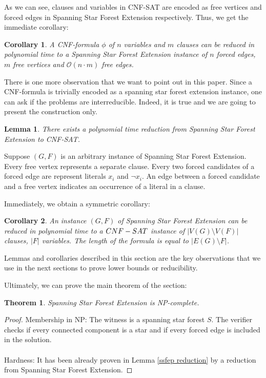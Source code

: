\documentclass[en]{pracamgr}
\newtheorem{theorem}{Theorem}
\newtheorem{lemma}{Lemma}
\newtheorem{corollary}{Corollary}
\newenvironment{sproof}{%
	\renewcommand{\proofname}{Proof (sketch).}\proof}{\endproof}
\newcommand{\ssfep}{{\sc Spanning Star Forest Extension}}
\newcommand{\cnfsat}{{\sc CNF-SAT}}
\begin{document}
As we can see, clauses and variables in \cnfsat{} are encoded as free vertices and forced edges in \ssfep{} respectively. Thus, we get the immediate corollary:

\begin{corollary}\label{ssfep size}
	A CNF-formula $\phi$ of $n$ variables and $m$ clauses can be reduced in polynomial time to a \ssfep{} instance of $n$ forced edges, $m$ free vertices and $\mathcal{O}(n\cdot m)$ free edges.
\end{corollary}

There is one more observation that we want to point out in this paper. Since a CNF-formula is trivially encoded as a spanning star forest extension instance, one can ask if the problems are interreducible. Indeed, it is true and we are going to present the construction only.

\begin{lemma}\label{cnfsat reduction}
	There exists a polynomial time reduction from \ssfep{} to \cnfsat{}.
\end{lemma}

\begin{sproof}
	Suppose $(G,F)$ is an arbitrary instance of \ssfep{}. Every free vertex represents a separate clause. Every two forced candidates of a forced edge are represent literals $x_i$ and $\neg x_i$. An edge between a forced candidate and a free vertex indicates an occurrence of a literal in a clause.
\end{sproof}

Immediately, we obtain a symmetric corollary:

\begin{corollary}\label{reduction size}
	An instance $(G,F)$ of \ssfep{} can be reduced in polynomial time to a $\cnfsat{}$ instance of $|V(G) \setminus V(F)|$ clauses, $|F|$ variables. The length of the formula is equal to $|E(G) \setminus F|$.
\end{corollary}

Lemmas and corollaries described in this section are the key observations that we use in the next sections to prove lower bounds or reducibility.

Ultimately, we can prove the main theorem of the section:
\begin{theorem}
	\ssfep{} is NP-complete.
\end{theorem}

\begin{proof}
	Membership in NP: The witness is a spanning star forest $S$. The verifier checks if every connected component is a star and if every forced edge is included in the solution.
	\\\\
	Hardness: It has been already proven in Lemma \ref{ssfep reduction} by a reduction from \ssfep{}.
\end{proof}
\end{document}
